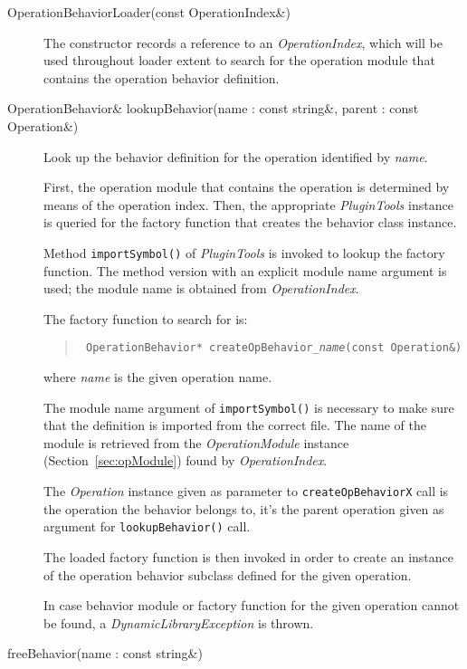 \documentclass[a4paper,twoside]{tce}
\begin{document}
\begin{description}

\item[OperationBehaviorLoader(const OperationIndex\&)] %
  The constructor records a reference to an \emph{OperationIndex}, which
  will be used throughout loader extent to search for the operation module
  that contains the operation behavior definition.

\item[OperationBehavior\& lookupBehavior(name : const string\&, 
parent : const Operation\&)] %

  Look up the behavior definition for the operation identified by
  \emph{name}.

  First, the operation module that contains the operation is determined by
  means of the operation index.  Then, the appropriate \emph{PluginTools}
  instance is queried for the factory function that creates the behavior
  class instance.

  Method \verb|importSymbol()| of \emph{PluginTools} is invoked to lookup
  the factory function.  The method version with an explicit module name
  argument is used; the module name is obtained from \emph{OperationIndex}.

  The factory function to search for is:
  \begin{quote}\tt
    OperationBehavior* createOpBehavior\verb|_|\textsl{name}(const Operation\&)
  \end{quote}
  where \emph{name} is the given operation name.

  The module name argument of \verb|importSymbol()| is necessary to make
  sure that the definition is imported from the correct file.  The name of
  the module is retrieved from the \emph{OperationModule} instance
  (Section~\ref{sec:opModule}) found by \emph{OperationIndex}.

  The \emph{Operation} instance given as parameter to \verb|createOpBehaviorX|
  call is the operation the behavior belongs to, it's the parent operation
  given as argument for \verb|lookupBehavior()| call.

  The loaded factory function is then invoked in order to create an instance
  of the operation behavior subclass defined for the given operation.

  In case behavior module or factory function for the given operation cannot
  be found, a \emph{DynamicLibraryException} is thrown.

\item[freeBehavior(name  : const string\&)]


\end{description}
\end{document}
